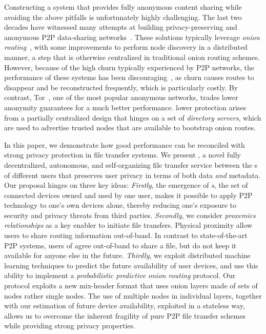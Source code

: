 Constructing a system that provides fully anonymous content sharing while avoiding the above pitfalls is unfortunately highly
challenging. The last two decades have witnessed many attempts at building privacy-preserving and anonymous P2P data-sharing
networks~\cite{Clarke:2001,Gnunet2002,Freedman:2002,Nambiar:2006,Rennhard:2002}.
These solutions typically leverage \emph{onion
 routing}~\cite{Chaum:1981}, with some improvements to perform node
 discovery in a distributed manner, a step that is otherwise
centralized in traditional onion routing schemes. However, because of the high
churn typically experienced by P2P networks, the performance of these systems has been
discouraging~\cite{LeBlond:2013}, as churn causes routes to disappear and be
reconstructed frequently, which is particularly costly. By contrast, 
Tor~\cite{Tor}, one of the most popular anonymous networks,
trades lower anonymity guarantees for a much better
performance.   lower protection arises from
a partially centralized design that hinges on a set of \emph{directory
servers}, which are used to advertise trusted nodes that are available to bootstrap onion
routes. 

In this paper, we demonstrate how good performance can be reconciled
with strong privacy protection in file transfer systems. We present
\name{}, a novel fully decentralized, autonomous,
and self-organizing file transfer service between the \squad{}s of different users that preserves user privacy
in terms of both data \emph{and} metadata.  Our proposal hinges on three
key ideas: \emph{Firstly}, the emergence of \emph{\squad{}s}, the set of connected devices owned and used by one user, 
makes it possible to apply P2P technology to one's own devices
alone, thereby reducing one's exposure to security and privacy threats
from third parties. \emph{Secondly}, we consider \emph{proxemics relationships} as a key enabler to initiate file
transfers. Physical proximity allow users to share
routing information out-of-band.
In contrast to state-of-the-art P2P systems, users of \name agree out-of-band to share a file, but
do not keep it available for anyone else in the future. \emph{Thirdly}, we
exploit distributed machine learning techniques to predict the future
availability of user devices, and use this ability to implement a
\emph{probabilistic predictive onion routing} protocol. Our protocol exploits a new mix-header format that uses onion layers made of sets of nodes rather single nodes. The use of multiple nodes in individual layers, together with our estimation of future device availability, exploited in a stateless way, allows
us to overcome the inherent fragility of pure P2P file transfer schemes while providing strong privacy properties. 


